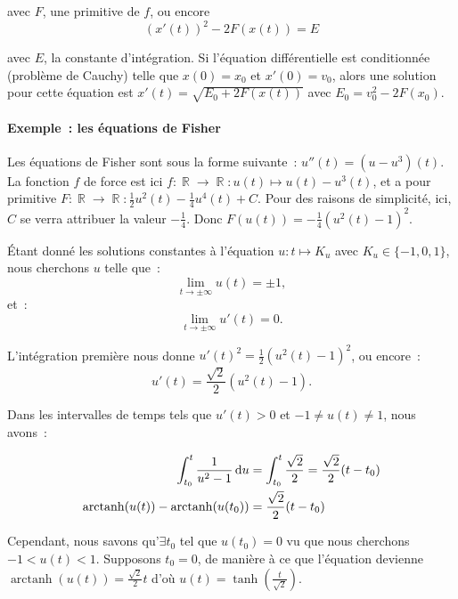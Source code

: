 \documentclass{article}
\DeclareMathOperator{\arctanh}{arctanh}
\DeclareMathOperator{\R}{\mathbb R}
\theoremstyle{definition}
\theoremstyle{remark}
\begin{document}
			avec $F$, une primitive de $f$, ou encore
			\[(x'(t))^2 - 2F(x(t)) = E\]

			avec $E$, la constante d'intégration. Si l'équation différentielle est conditionnée (problème de Cauchy) telle que $x(0) = x_0$ et $x'(0) = v_0$, alors
			une solution pour cette équation est $x'(t) = \sqrt{E_0 + 2F(x(t))}$ avec $E_0 = v_0^2 - 2F(x_0)$.

				\paragraph{Exemple~: les équations de Fisher} Les équations de Fisher sont sous la forme suivante~: $u''(t) = (u - u^3)(t)$. La fonction $f$ de force
				est ici $f : \R \to \R : u(t) \mapsto u(t) - u^3(t)$, et a pour primitive $F : \R \to \R : \frac 12u^2(t) - \frac 14u^4(t) + C$.
				Pour des raisons de simplicité, ici, $C$ se verra attribuer la valeur $-\frac 14$. Donc $F(u(t)) = -\frac 14(u^2(t) - 1)^2$.

				Étant donné les solutions constantes à l'équation $u : t \mapsto K_u$ avec $K_u \in \{-1, 0, 1\}$, nous cherchons $u$ telle que~:
				\[\lim_{t \to \pm \infty}u(t) = \pm 1,\]
				et~:
				\[\lim_{t \to \pm\infty}u'(t) = 0.\]

				L'intégration première nous donne $u'(t)^2 = \frac 12(u^2(t) - 1)^2$, ou encore~:
				\[u'(t) = \frac {\sqrt{2}}{2}(u^2(t) - 1).\]

				Dans les intervalles de temps tels que $u'(t) > 0$ et $-1 \neq u(t) \neq 1$, nous avons~:

				\[\begin{aligned}
					\int_{t_0}^t \frac {1}{u^2 - 1}\dif u &= \int_{t_0}^t \frac {\sqrt{2}}{2} = \frac{\sqrt{2}}{2} (t - t_0) \\
					\arctanh(u(t)) - \arctanh(u(t_0)) &= \frac{\sqrt{2}}{2} (t - t_0)
				\end{aligned}\]

				Cependant, nous savons qu'$\exists t_0$ tel que $u(t_0) = 0$ vu que nous cherchons $-1 < u(t) < 1$. Supposons $t_0 = 0$, de manière à ce que
				l'équation devienne $\arctanh(u(t)) = \frac {\sqrt{2}}{2}t$ d'où $u(t) = \tanh(\frac t{\sqrt 2})$.
\end{document}
